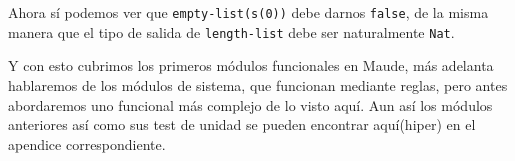 Ahora sí podemos ver que \verb"empty-list(s(0))" debe darnos \texttt{false}, de la misma manera que el tipo de salida de \verb"length-list" debe ser naturalmente \texttt{Nat}.\par 

Y con esto cubrimos los primeros módulos funcionales en Maude, más adelanta hablaremos de los módulos de sistema, que funcionan mediante reglas, pero antes abordaremos uno funcional más complejo de lo visto aquí. Aun así los módulos anteriores así como sus test de unidad se pueden encontrar aquí(hiper) en el apendice correspondiente.\par 


